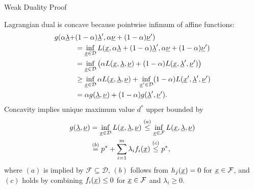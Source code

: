 \documentclass[10pt,letterpaper,english]{beamer}
\newcommand{\backupbegin}{
   \newcounter{finalframe}
   \setcounter{finalframe}{\value{framenumber}}
}
\newcommand{\backupend}{
   \setcounter{framenumber}{\value{finalframe}}
}
\begin{document}
\begin{frame}{Weak Duality Proof}

Lagrangian dual is concave because pointwise infimum of affine functions:\vspace{-1mm}
\begin{align*}
g(\alpha\vecnot{\lambda}+&(1-\alpha)\vecnot{\lambda}',\alpha\vecnot{\nu}+(1-\alpha)\vecnot{\nu}') \\
&= \inf_{\vecnot{x}\in \mathcal{D}} L(\vecnot{x},\alpha\vecnot{\lambda}+(1-\alpha)\vecnot{\lambda}',\alpha\vecnot{\nu}+(1-\alpha) \vecnot{\nu}') \\
&= \inf_{\vecnot{x}\in \mathcal{D}} \big( \alpha L(\vecnot{x},\vecnot{\lambda},\vecnot{\nu}) + (1-\alpha) L(\vecnot{x},\vecnot{\lambda}',\vecnot{\nu}') \big) \\
&\geq \inf_{\vecnot{x}\in \mathcal{D}} \alpha L(\vecnot{x},\vecnot{\lambda},\vecnot{\nu}) + \inf_{\vecnot{x}'\in \mathcal{D}} (1-\alpha) L(\vecnot{x}',\vecnot{\lambda}',\vecnot{\nu}') \\
&= \alpha g(\vecnot{\lambda},\vecnot{\nu}) + (1-\alpha) g(\vecnot{\lambda}',\vecnot{\nu}'). \vspace{-1mm}
\end{align*}
Concavity implies unique maximum value $d^*$ upper bounded by \vspace{-2mm}
\begin{align*}
g(\vecnot{\lambda},\vecnot{\nu})
&= \inf_{\vecnot{x}\in \mathcal{D}} L(\vecnot{x},\vecnot{\lambda},\vecnot{\nu})
\stackrel{(a)}{\leq} \inf_{\vecnot{x}\in \mathcal{F}} L(\vecnot{x},\vecnot{\lambda},\vecnot{\nu}) \\
&\stackrel{(b)}{=} p^* + \sum_{i=1}^m \lambda_i f_i (\vecnot{x})
\stackrel{(c)}{\leq} p^*, \vspace{-3mm}
\end{align*}
where $(a)$ is implied by $\mathcal{F} \subseteq \mathcal{D}$, $(b)$ follows from $h_j(\underline{x}) = 0$ for $\underline{x}\in \mathcal{F}$, and $(c)$ holds by combining $f_i(\underline{x}) \leq 0$ for $\underline{x}\in \mathcal{F}$ and $\lambda_i \geq 0$.

\end{frame}

\backupbegin


%
%

\backupend
\end{document}
